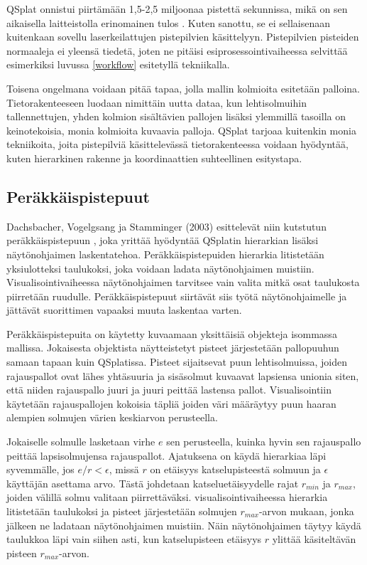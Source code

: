 QSplat onnistui piirtämään 1,5-2,5 miljoonaa pistettä sekunnissa, mikä on sen aikaisella laitteistolla erinomainen tulos \cite{qsplat}. Kuten sanottu, se ei sellaisenaan kuitenkaan sovellu laserkeilattujen pistepilvien käsittelyyn. Pistepilvien pisteiden normaaleja ei yleensä tiedetä, joten ne pitäisi esiprosessointivaiheessa selvittää esimerkiksi luvussa \ref{workflow} esitetyllä tekniikalla. 

Toisena ongelmana voidaan pitää tapaa, jolla mallin kolmioita esitetään palloina. Tietorakenteeseen luodaan nimittäin uutta dataa, kun lehtisolmuihin tallennettujen, yhden kolmion sisältävien pallojen lisäksi ylemmillä tasoilla on keinotekoisia, monia kolmioita kuvaavia palloja. QSplat tarjoaa kuitenkin monia tekniikoita, joita pistepilviä käsittelevässä tietorakenteessa voidaan hyödyntää, kuten hierarkinen rakenne ja koordinaattien suhteellinen esitystapa.

\subsection{Peräkkäispistepuut}
Dachsbacher, Vogelgsang ja Stamminger (2003) esittelevät niin kutstutun peräkkäispistepuun , joka yrittää hyödyntää QSplatin hierarkian lisäksi näytönohjaimen laskentatehoa. Peräkkäispistepuiden hierarkia litistetään yksiulotteksi taulukoksi, joka voidaan ladata näytönohjaimen muistiin. Visualisointivaiheessa näytönohjaimen tarvitsee vain valita mitkä osat taulukosta piirretään ruudulle. Peräkkäispistepuut siirtävät siis työtä näytönohjaimelle ja jättävät suorittimen vapaaksi muuta laskentaa varten. \cite{spt}

Peräkkäispistepuita on käytetty kuvaamaan yksittäisiä objekteja isommassa mallissa. Jokaisesta objektista näytteistetyt pisteet järjestetään pallopuuhun samaan tapaan kuin QSplatissa. Pisteet sijaitsevat puun lehtisolmuissa, joiden rajauspallot ovat lähes yhtäsuuria ja sisäsolmut kuvaavat lapsiensa unionia siten, että niiden rajauspallo juuri ja juuri peittää lastensa pallot. Visualisointiin käytetään rajauspallojen kokoisia täpliä joiden väri määräytyy puun haaran alempien solmujen värien keskiarvon perusteella. \cite{spt}

Jokaiselle solmulle lasketaan virhe $e$ sen perusteella, kuinka hyvin sen rajauspallo peittää lapsisolmujensa rajauspallot. Ajatuksena on käydä hierarkiaa läpi syvemmälle, jos $e/r < \epsilon$, missä $r$ on etäisyys katselupisteestä solmuun ja $\epsilon$ käyttäjän asettama arvo. Tästä johdetaan katseluetäisyydelle rajat $r_{min}$ ja $r_{max}$, joiden välillä solmu valitaan piirrettäväksi. visualisointivaiheessa hierarkia litistetään taulukoksi ja pisteet järjestetään solmujen $r_{max}$-arvon mukaan, jonka jälkeen ne ladataan näytönohjaimen muistiin. Näin näytönohjaimen täytyy käydä taulukkoa läpi vain siihen asti, kun katselupisteen etäisyys $r$ ylittää käsiteltävän pisteen $r_{max}$-arvon. \cite{spt}

